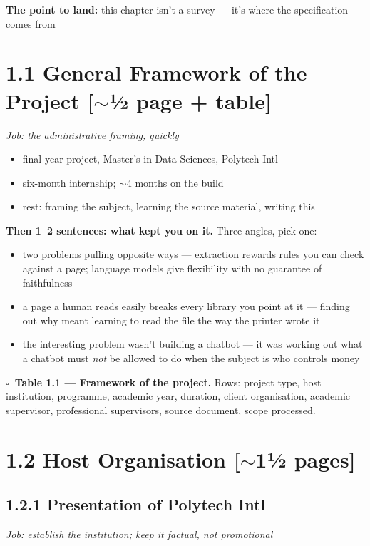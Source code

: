 \documentclass[11pt,a4paper]{article}
\newcommand{\job}[1]{\par\vspace{2pt}\noindent\textcolor{gr}{\textit{Job: #1}}\par\vspace{2pt}}
\newcommand{\turn}[1]{\par\vspace{3pt}\noindent\textbf{The point to land:} #1\par}
\newcommand{\len}[1]{\hfill\textcolor{gr}{\small[#1]}}
\newcommand{\todo}{$\square$~}
\begin{document}
\turn{this chapter isn't a survey --- it's where the specification comes from}

\section*{1.1 General Framework of the Project \len{$\sim$½ page + table}}
\job{the administrative framing, quickly}

\begin{itemize}
\item final-year project, Master's in Data Sciences, Polytech Intl
\item six-month internship; $\sim$4 months on the build
\item rest: framing the subject, learning the source material, writing this
\end{itemize}

\textbf{Then 1--2 sentences: what kept you on it.} Three angles, pick one:
\begin{itemize}
\item[(a)] two problems pulling opposite ways --- extraction rewards rules you can
check against a page; language models give flexibility with no guarantee of faithfulness
\item[(b)] a page a human reads easily breaks every library you point at it ---
finding out why meant learning to read the file the way the printer wrote it
\item[(c)] the interesting problem wasn't building a chatbot --- it was working out
what a chatbot must \emph{not} be allowed to do when the subject is who controls money
\end{itemize}

\textbf{\todo Table 1.1 --- Framework of the project.} Rows: project type, host
institution, programme, academic year, duration, client organisation, academic
supervisor, professional supervisors, source document, scope processed.

\section*{1.2 Host Organisation \len{$\sim$1½ pages}}

\subsection*{1.2.1 Presentation of Polytech Intl}
\job{establish the institution; keep it factual, not promotional}
\end{document}
